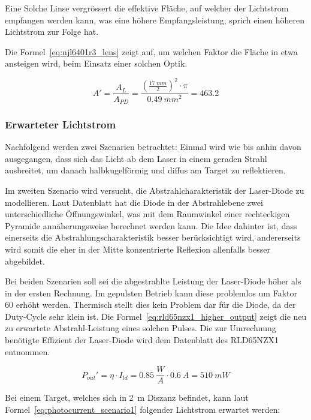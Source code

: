 Eine Solche Linse vergrössert die effektive Fläche, auf welcher der Lichtstrom empfangen werden kann, was
eine höhere Empfangsleistung, sprich einen höheren Lichtstrom zur Folge hat.

Die Formel~\ref{eq:njl6401r3_lens} zeigt auf, um welchen Faktor die Fläche in etwa ansteigen wird, beim Einsatz einer
solchen Optik.

\begin{equation}\label{eq:njl6401r3_lens}
    A' = \frac{A_{L}}{A_{PD}} = \frac{(\frac{17~mm}{2})^2 \cdot \pi}{0.49~mm^2} = 463.2
\end{equation}

\subsubsection{Erwarteter Lichtstrom}
Nachfolgend werden zwei Szenarien betrachtet: Einmal wird wie bis anhin davon ausgegangen, dass sich das Licht ab dem Laser
in einem geraden Strahl ausbreitet, um danach halbkugelförmig und diffus am Target zu reflektieren.

Im zweiten Szenario wird versucht, die Abstrahlcharakteristik der Laser-Diode zu modellieren. Laut Datenblatt hat die
Diode in der Abstrahlebene zwei unterschiedliche Öffnungswinkel, was mit dem Raumwinkel einer rechteckigen Pyramide
annäherungsweise berechnet werden kann. Die Idee dahinter ist, dass einerseits die Abstrahlungscharakteristik
besser berücksichtigt wird, andererseits wird somit die eher in der Mitte konzentrierte Reflexion allenfalls besser abgebildet.

Bei beiden Szenarien soll sei die abgestrahlte Leistung der Laser-Diode höher als in der ersten Rechnung. Im gepulsten
Betrieb kann diese problemlos um Faktor 60 erhöht werden. Thermisch stellt dies kein Problem dar für die Diode, da
der Duty-Cycle sehr klein ist. Die Formel~\ref{eq:rld65nzx1_higher_output} zeigt die neu zu erwartete Abstrahl-Leistung
eines solchen Pulses. Die zur Umrechnung benötigte Effizient der Laser-Diode wird dem Datenblatt des RLD65NZX1 entnommen.
\cite{rohm2019rld65nzx1_datasheet}

\begin{equation}\label{eq:rld65nzx1_higher_output}
    P_{out}' = \eta \cdot I_{ld} = 0.85~\frac{W}{A} \cdot 0.6~A = 510~mW
\end{equation}

Bei einem Target, welches sich in 2~m Diszanz befindet, kann laut Formel~\ref{eq:photocurrent_scenario1} folgender
Lichtstrom erwartet werden:

